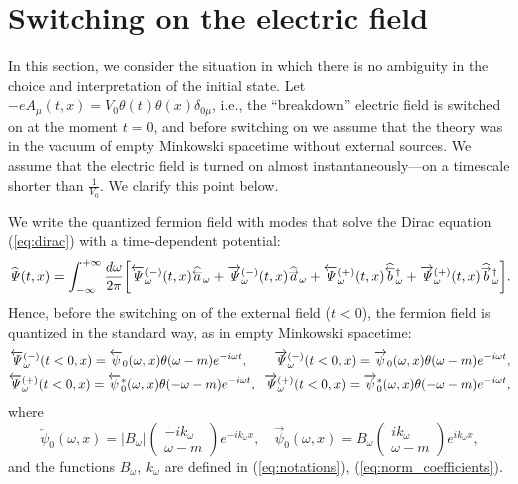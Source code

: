 \documentclass[12pt]{article}
\newcommand\beq{\begin{equation}}
\newcommand\eeq{\end{equation}}
\def\kw{k_{\omega}} \def\pw{p_{\omega}}
\def\hataL{\widehat{ \overset{\smash{\raisebox{-0.45ex}{$\scriptstyle\leftarrow$}}}{a} }}
\def\hatbL{\widehat{ \overset{\smash{\raisebox{-0.5ex}{$\scriptstyle\leftarrow$}}}{b} }}
\def\hataR{\widehat{ \overset{\smash{\raisebox{-0.45ex}{$\scriptstyle\rightarrow$}}}{a} }}
\def\hatbR{\widehat{ \overset{\smash{\raisebox{-0.5ex}{$\scriptstyle\rightarrow$}}}{b} }}
\def\w{\omega}
\numberwithin{equation}{section}
\begin{document}
\section{Switching on the electric field}\label{sec:Turning on the electric field}
In this section, we consider the situation in which there is no ambiguity in the choice and interpretation of the initial state. Let $-eA_{\mu}(t,x) = V_0\theta(t)\theta(x)\delta_{0\mu}$, i.e., the ``breakdown'' electric field is switched on at the moment $t=0$, and before switching on we assume that the theory was in the vacuum of empty Minkowski spacetime without external sources. We assume that the electric field is turned on almost instantaneously—on a timescale shorter than $\frac{1}{V_0}$. We clarify this point below.

We write the quantized fermion field with modes that solve the Dirac equation (\ref{eq:dirac}) with a time-dependent potential:
\beq\label{eq:decomposition_general}
\begin{aligned}
    \widehat{\mathit{\Psi}}(t,x) = \int_{-\infty}^{+\infty}\frac{d\omega}{2\pi}\bigg[\overleftarrow{\mathit{\Psi}}\phantom{\empty}^{(-)}_{\w}(t,x)\hataL_{\w} + \overrightarrow{\mathit{\Psi}}\phantom{\empty}^{(-)}_{\w}(t,x)\hataR_{\w} + \overleftarrow{\mathit{\Psi}}\phantom{\empty}^{(+)}_{\w}(t,x)\hatbL\phantom{\empty}^{\dagger}_{\w} + \overrightarrow{\mathit{\Psi}}\phantom{\empty}^{(+)}_{\w}(t,x)\hatbR\phantom{\empty}^{\dagger}_{\w}\bigg].
\end{aligned}
\eeq
Hence, before the switching on of the external field ($t<0$), the fermion field is quantized in the standard way, as in empty Minkowski spacetime:
\beq\label{eq:modes_before_electric_field}
\begin{aligned}
    \overleftarrow{\mathit{\Psi}}\phantom{\empty}^{(-)}_{\w}(t<0,x) = \overleftarrow{\psi}_{0}(\w,x)\theta(\w-m)e^{-i\w t},\quad\quad\overrightarrow{\mathit{\Psi}}\phantom{\empty}^{(-)}_{\w}(t<0,x) = \overrightarrow{\psi}_{0}(\w,x)\theta(\w-m)e^{-i\w t},
    \\
    \overleftarrow{\mathit{\Psi}}\phantom{\empty}^{(+)}_{\w}(t<0,x) = \overleftarrow{\psi}_{0}^{*}(\w,x)\theta(-\w-m)e^{-i\w t},\;\;\overrightarrow{\mathit{\Psi}}\phantom{\empty}^{(+)}_{\w}(t<0,x) = \overrightarrow{\psi}_{0}^{*}(\w,x)\theta(-\w-m)e^{-i\w t},
\end{aligned}
\eeq
where
\beq\label{eq:empty_space_modes}
    \overleftarrow{\psi}_{0}(\w,x) = \Big|B_{\w}\Big|
    \begin{pmatrix}
        -i\kw\\
        \w-m
    \end{pmatrix}e^{-i\kw x},\quad
     \overrightarrow{\psi}_{0}(\w,x) = B_{\w}
    \begin{pmatrix}
        i\kw\\
        \w-m
    \end{pmatrix}e^{i\kw x},
\eeq
and the functions $B_{\w}$, $\kw$ are defined in (\ref{eq:notations}), (\ref{eq:norm_coefficients}). 
\end{document}

